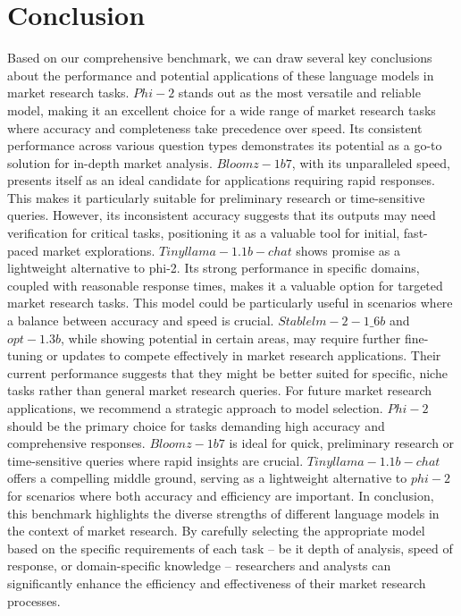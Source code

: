 \documentclass[12pt,a4paper]{article}
\begin{document}
	\section{Conclusion}
	Based on our comprehensive benchmark, we can draw several key conclusions about the performance and potential applications of these language models in market research tasks.
	$Phi-2$ stands out as the most versatile and reliable model, making it an excellent choice for a wide range of market research tasks where accuracy and completeness take precedence over speed. Its consistent performance across various question types demonstrates its potential as a go-to solution for in-depth market analysis.
	$Bloomz-1b7$, with its unparalleled speed, presents itself as an ideal candidate for applications requiring rapid responses. This makes it particularly suitable for preliminary research or time-sensitive queries. However, its inconsistent accuracy suggests that its outputs may need verification for critical tasks, positioning it as a valuable tool for initial, fast-paced market explorations.
	$Tinyllama-1.1b-chat$ shows promise as a lightweight alternative to phi-2. Its strong performance in specific domains, coupled with reasonable response times, makes it a valuable option for targeted market research tasks. This model could be particularly useful in scenarios where a balance between accuracy and speed is crucial.
	$Stablelm-2-1\_6b$ and $opt-1.3b$, while showing potential in certain areas, may require further fine-tuning or updates to compete effectively in market research applications. Their current performance suggests that they might be better suited for specific, niche tasks rather than general market research queries.
	For future market research applications, we recommend a strategic approach to model selection. $Phi-2$ should be the primary choice for tasks demanding high accuracy and comprehensive responses. $Bloomz-1b7$ is ideal for quick, preliminary research or time-sensitive queries where rapid insights are crucial. $Tinyllama-1.1b-chat$ offers a compelling middle ground, serving as a lightweight alternative to $phi-2$ for scenarios where both accuracy and efficiency are important.
	In conclusion, this benchmark highlights the diverse strengths of different language models in the context of market research. By carefully selecting the appropriate model based on the specific requirements of each task – be it depth of analysis, speed of response, or domain-specific knowledge – researchers and analysts can significantly enhance the efficiency and effectiveness of their market research processes.
	
	
	
	
\end{document}
